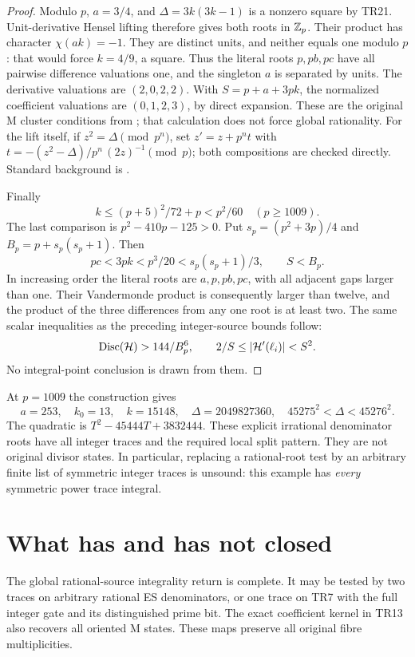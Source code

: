 \begin{proof}
Modulo $p$, $a=3/4$, and
$\Delta=3k(3k-1)$ is a nonzero square by TR21. Unit-derivative Hensel lifting
therefore gives both roots in $\mathbb Z_p$. Their product has character
$\chi(ak)=-1$. They are distinct units, and neither equals one modulo $p$:
that would force $k=4/9$, a square. Thus the literal roots $p,pb,pc$ have all
pairwise difference valuations one, and the singleton $a$ is separated by
units. The derivative valuations are $(2,0,2,2)$. With
$S=p+a+3pk$, the normalized coefficient valuations are $(0,1,2,3)$, by direct
expansion. These are the original M cluster conditions from
\cite[IC7, IC14]{Previous}; that calculation does not force global rationality.
For the lift itself, if $z^2=\Delta\pmod{p^n}$, set
$z'=z+p^nt$ with $t=-(z^2-\Delta)/p^n\,(2z)^{-1}\pmod p$; both compositions
are checked directly. Standard background is \cite[Chapter 7]{Milne}.

Finally
\[
 k\le(p+5)^2/72+p<p^2/60\quad(p\ge1009).
\]
The last comparison is $p^2-410p-125>0$. Put
$s_p=(p^2+3p)/4$ and $B_p=p+s_p(s_p+1)$. Then
\[
 pc<3pk<p^3/20<s_p(s_p+1)/3,\qquad S<B_p.
\]
In increasing order the literal roots are $a,p,pb,pc$, with all adjacent gaps
larger than one. Their Vandermonde product is consequently larger than twelve,
and the product of the three differences from any one root is at least two.
The same scalar inequalities as the preceding integer-source bounds follow:
\[
 \operatorname{Disc}(\mathcal H)>144/B_p^6,\qquad
 2/S\le|\mathcal H'(\ell_i)|<S^2.
\]
No integral-point conclusion is drawn from them.
\end{proof}

At $p=1009$ the construction gives
\[
 a=253,\quad k_0=13,\quad k=15148,\quad
 \Delta=2049827360,\quad
 45275^2<\Delta<45276^2.
\]
The quadratic is $T^2-45444T+3832444$. These explicit irrational denominator
roots have all integer traces and the required local split pattern. They are
not original divisor states. In particular, replacing a rational-root test by
an arbitrary finite list of symmetric integer traces is unsound: this example
has \emph{every} symmetric power trace integral.

\section{What has and has not closed}
The global rational-source integrality return is complete. It may be tested by
two traces on arbitrary rational ES denominators, or one trace on TR7 with the
full integer gate and its distinguished prime bit. The exact coefficient kernel
in TR13 also recovers all oriented M states. These maps preserve all original
fibre multiplicities.


